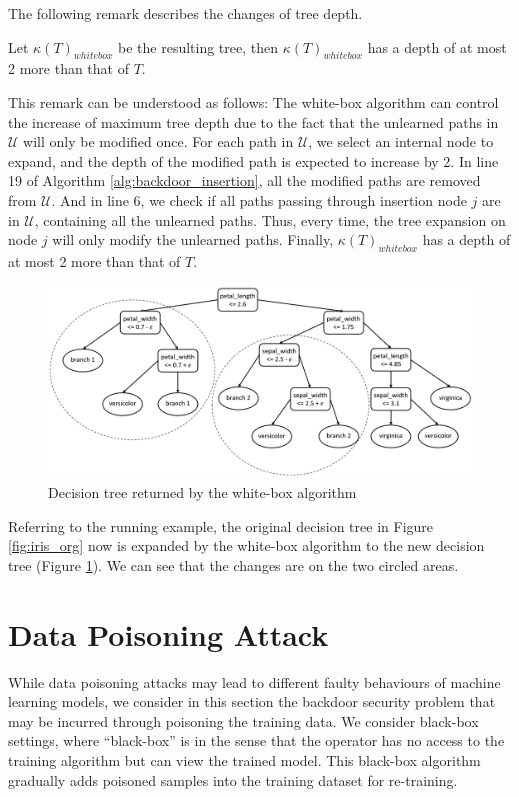 The following remark describes the changes of tree depth. 
\begin{lemma}\label{lemma:treedepth}
Let $\kappa(T)_{whitebox}$ be the resulting tree, then $\kappa(T)_{whitebox}$ has a depth of at most 2 more than that of $T$. 
\end{lemma}
This remark can be understood as follows: The white-box algorithm can control the increase of maximum tree depth due to the fact that the unlearned paths in $\mathcal{U}$ will only be modified once. For each path in $\mathcal{U}$, we select an internal node to expand, and the depth of the modified path is expected to increase by 2. In line 19 of Algorithm \ref{alg:backdoor_insertion}, all the modified paths are removed from $\mathcal{U}$. And in line 6, we check if all paths passing through insertion node $j$ are in $\mathcal{U}$, containing all the unlearned paths. Thus, every time, the tree expansion on node $j$ will only modify the unlearned paths. Finally, $\kappa(T)_{whitebox}$ has a depth of at most 2 more than that of $T$.


\begin{figure}[!thbp]
    \centering
    \includegraphics[width=\linewidth]{images/simpleML/3.png}
    \caption{Decision tree returned by the white-box algorithm}
    \label{fig:iris_whitebox}
\end{figure}

Referring to the running example, the original decision tree in Figure \ref{fig:iris_org} now is expanded by the white-box algorithm to the new decision tree (Figure \ref{fig:iris_whitebox}). We can see that the changes are on the two circled areas. 


\section{Data Poisoning Attack}\label{sec:datapoisoningdecisiontree}


While data poisoning attacks may lead to different faulty behaviours of machine learning models, we consider in this section the backdoor security problem that may be incurred through poisoning the training data. 
We consider black-box settings, where ``black-box'' is in the sense that the operator has no access to the training algorithm but can view the trained model. This black-box algorithm \cite{huang2020embedding} gradually adds poisoned samples into the training dataset for re-training. 

